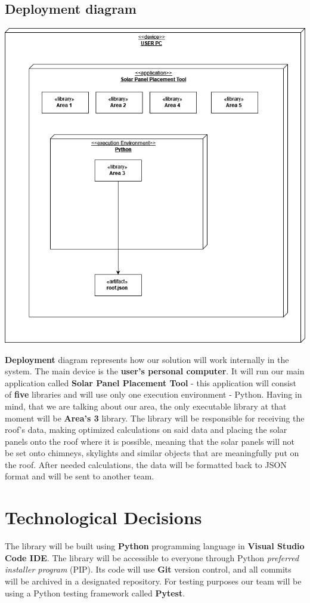 \documentclass[a4paper,12pt,fleqn]{article}
\begin{document}
\subsection{Deployment diagram}
\begin{center}
    \includegraphics[scale=0.4]{main/images/deployment3.png}
\end{center}
\textbf{Deployment} diagram represents how our solution will work internally in the system. The main device is the \textbf{user's personal computer}. It will run our main application called \textbf{Solar Panel Placement Tool} - this application will consist of \textbf{five} libraries and will use only one execution environment - Python. Having in mind, that we are talking about our area, the only executable library at that moment will be \textbf{Area's 3} library. The library will be responsible for receiving the roof's data, making optimized calculations on said data and placing the solar panels onto the roof where it is possible, meaning that the solar panels will not be set onto chimneys, skylights and similar objects that are meaningfully put on the roof. After needed calculations, the data will be formatted back to JSON format and will be sent to another team.



\newpage
\section{Technological Decisions}
The library will be built using \textbf{Python} programming language in \textbf{Visual Studio Code IDE}. The library will be accessible to everyone through Python \textit{preferred installer program} (PIP). Its code will use \textbf{Git} version control, and all commits will be archived in a designated repository.\newline
For testing purposes our team will be using a Python testing framework called \textbf{Pytest}. 
\end{document}
